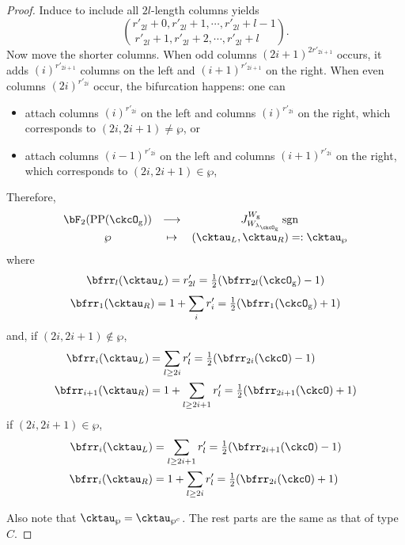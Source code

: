 \documentclass[12pt,a4paper]{amsart}
\newcommand{\sgn}{\operatorname{sgn}}
\numberwithin{equation}{section}
\theoremstyle{remark}
\def\half{{\tfrac{1}{2}}}
\def\lamckg{\lambda_{\ckcO_{\mathrm g}}}
\def\CPP{\mathrm{PP}}
\begin{document}
\begin{proof}
{{      Induce to include all $2l$-length columns yields
      \[
        \binom{r'_{2l}+0,r'_{2l}+1, \cdots, r'_{2l}+l-1}{ r'_{2l}+1,r'_{2l}+2, \cdots, r'_{2l}+l\phantom{-1}}.
      \]
      Now move the shorter columns. When odd columns $(2i+1)^{2r'_{2i+1}}$
      occurs, it adds $(i)^{r'_{2i+1}}$ columns on the left and
      $(i+1)^{r'_{2i+1}}$ on the right. When even columns $(2i)^{r'_{2i}}$
      occur, the bifurcation happens: one can
      \begin{itemize}
        \item attach columns $(i)^{r'_{2i}}$ on the left and columns
              $(i)^{r'_{2i}}$ on the right, which corresponds to
              $(2i,2i+1)\neq \wp$, or
        \item attach columns $(i-1)^{r'_{2i}}$ on the left and columns
              $(i+1)^{r'_{2i}}$ on the right, which corresponds to
              $(2i,2i+ 1)\in \wp$,
      \end{itemize}

      Therefore,
      \[
        \begin{array}{ccc}
          \bF_{2}(\CPP(\ckcO_{\mathrm g}))&\longrightarrow
          & J_{W_{\lamckg}}^{W_{\mathrm g}} \sgn \\
          \wp&\mapsto&    (\cktau_{L},\cktau_{R}) =:\cktau_{\wp}
        \end{array}
      \]
      where
      \[
        \bfrr_{l}(\cktau_{L}) = r'_{2l} = \half (\bfrr_{2l}(\ckcO_{\mathrm g})-1)
      \]
      \[
        \bfrr_{1}(\cktau_{R}) = 1+ \sum_{i} r'_{i} = \half (\bfrr_{1}(\ckcO_{\mathrm g})+1)
      \]
      and, if $(2i,2i+1)\notin \wp$,
      \[
        \begin{split}
          \bfrr_{i}(\cktau_{L}) & = \sum_{l\geq 2i} r'_{l}
          = \half(\bfrr_{2i}(\ckcO)-1)\\
          \bfrr_{i+1}(\cktau_{R}) & = 1 + \sum_{l\geq 2i+1} r'_{l} = \half(\bfrr_{2i+1}(\ckcO)+1)
        \end{split}
      \]
      if $(2i,2i+1)\in \wp$,
      \[
        \begin{split}
          \bfrr_{i}(\cktau_{L}) & = \sum_{l\geq 2i+1} r'_{l}
          = \half(\bfrr_{2i+1}(\ckcO)-1)\\
          \bfrr_{i}(\cktau_{R}) & = 1 + \sum_{l\geq 2i} r'_{l} = \half(\bfrr_{2i}(\ckcO)+1)
        \end{split}
      \]

      Also note that $\cktau_{\wp}=\cktau_{\wp^{c}}$. The rest parts are the
      same as that of type $C$.

}}
\end{proof}
\end{document}
